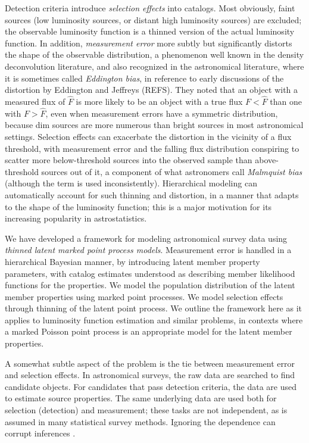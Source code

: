Detection criteria introduce \emph{selection effects} into catalogs.
Most obviously, faint sources (low luminosity sources, or distant high luminosity sources) are excluded; the observable luminosity function is a thinned version of the actual luminosity function.
In addition, \emph{measurement error} more subtly but significantly distorts the shape of the observable distribution, a phenomenon well known in the density deconvolution literature, and also recognized in the astronomical literature, where it is sometimes called \emph{Eddington bias}, in reference to early discussions of the distortion by Eddington and Jeffreys (REFS).
They noted that an object with a measured flux of $\hat F$ is more likely to be an object with a true flux $F < \hat F$ than one with $F > \hat F$, even when measurement errors have a symmetric distribution, because dim sources are more numerous than bright sources in most astronomical settings.
Selection effects can exacerbate the distortion in the vicinity of a flux threshold, with measurement error and the falling flux distribution conspiring to scatter more below-threshold sources into the observed sample than above-threshold sources out of it, a component of what astronomers call \emph{Malmquist bias} \citep{binney1998galactic} (although the term is used inconsistently).
Hierarchical modeling can automatically account for such thinning and distortion, in a manner that adapts to the shape of the luminosity function; this is a major motivation for its increasing popularity in astrostatistics.

We have developed a framework for modeling astronomical survey data using \emph{thinned latent marked point process models}.
Measurement error is handled in a hierarchical Bayesian manner, by introducing latent member property parameters, with catalog estimates understood as describing member likelihood functions for the properties.
We model the population distribution of the latent member properties using marked point processes.
We model selection effects through thinning of the latent point process.
We outline the framework here as it applies to luminosity function estimation and similar problems, in contexts where a marked Poisson point process is an appropriate model for the latent member properties. 

A somewhat subtle aspect of the problem is the tie between measurement error and selection effects.
In astronomical surveys, the raw data are searched to find candidate objects.
For candidates that pass detection criteria, the data are used to estimate source properties.
The same underlying data are used both for selection (detection) and measurement; these tasks are not independent, as is assumed in many statistical survey methods.
Ignoring the dependence can corrupt inferences .

